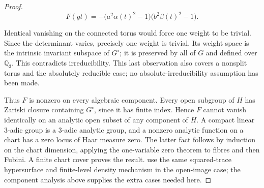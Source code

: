 \begin{proof}
\[
F(gt)=-
\bigl(a^2\alpha(t)^2-1\bigr)
\bigl(b^2\beta(t)^2-1\bigr).
\]

Identical vanishing on the connected torus would force one weight to be
trivial. Since the determinant varies, precisely one weight is trivial.
Its weight space is the intrinsic invariant subspace of \(G^\circ\); it
is preserved by all of \(G\) and defined over \(\mathbb Q_3\). This
contradicts irreducibility. This last observation also covers a nonsplit
torus and the absolutely reducible case; no absolute-irreducibility
assumption has been made.

Thus \(F\) is nonzero on every algebraic component. Every open subgroup
of \(H\) has Zariski closure containing \(G^\circ\), since it has finite
index. Hence \(F\) cannot vanish identically on an analytic open subset
of any component of \(H\). A compact linear 3-adic group is a 3-adic
analytic group, and a nonzero analytic function on a chart has a zero
locus of Haar measure zero. The latter fact follows by induction on the
chart dimension, applying the one-variable zero theorem to fibres and
then Fubini. A finite chart cover proves the result. \citet[\S2.4, author pp.~4--5]{KhareRajan2001} use the same squared-trace hypersurface and
finite-level density mechanism in the open-image case; the component
analysis above supplies the extra cases needed here.

\end{proof}

